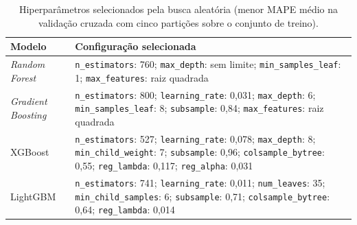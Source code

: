 \begin{table}[ht]
\centering
\caption{Hiperparâmetros selecionados pela busca aleatória (menor MAPE médio na validação cruzada com cinco partições sobre o conjunto de treino).}
\label{tab:hiper_escolhidos}
\begin{tabularx}{\textwidth}{lX}
\toprule
\textbf{Modelo} & \textbf{Configuração selecionada} \\
\midrule
\textit{Random Forest} & \texttt{n\_estimators}: 760; \texttt{max\_depth}: sem limite; \texttt{min\_samples\_leaf}: 1; \texttt{max\_features}: raiz quadrada \\
\textit{Gradient Boosting} & \texttt{n\_estimators}: 800; \texttt{learning\_rate}: 0,031; \texttt{max\_depth}: 6; \texttt{min\_samples\_leaf}: 8; \texttt{subsample}: 0,84; \texttt{max\_features}: raiz quadrada \\
XGBoost & \texttt{n\_estimators}: 527; \texttt{learning\_rate}: 0,078; \texttt{max\_depth}: 8; \texttt{min\_child\_weight}: 7; \texttt{subsample}: 0,96; \texttt{colsample\_bytree}: 0,55; \texttt{reg\_lambda}: 0,117; \texttt{reg\_alpha}: 0,031 \\
LightGBM & \texttt{n\_estimators}: 741; \texttt{learning\_rate}: 0,011; \texttt{num\_leaves}: 35; \texttt{min\_child\_samples}: 6; \texttt{subsample}: 0,71; \texttt{colsample\_bytree}: 0,64; \texttt{reg\_lambda}: 0,014 \\
\bottomrule
\end{tabularx}
\end{table}
